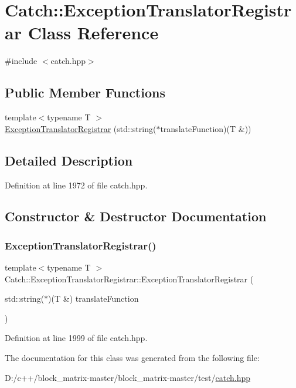 \hypertarget{class_catch_1_1_exception_translator_registrar}{}\section{Catch\+:\+:Exception\+Translator\+Registrar Class Reference}
\label{class_catch_1_1_exception_translator_registrar}


{\ttfamily \#include $<$catch.\+hpp$>$}

\subsection*{Public Member Functions}
\begin{DoxyCompactItemize}
\item 
{\footnotesize template$<$typename T $>$ }\\\mbox{\hyperlink{class_catch_1_1_exception_translator_registrar_aa73229de911f26b1df6c6c87c4d9e04e}{Exception\+Translator\+Registrar}} (std\+::string($\ast$translate\+Function)(T \&))
\end{DoxyCompactItemize}


\subsection{Detailed Description}


Definition at line 1972 of file catch.\+hpp.



\subsection{Constructor \& Destructor Documentation}
\mbox{\label{class_catch_1_1_exception_translator_registrar_aa73229de911f26b1df6c6c87c4d9e04e}} 
\subsubsection{\texorpdfstring{Exception\+Translator\+Registrar()}{ExceptionTranslatorRegistrar()}}
{\footnotesize\ttfamily template$<$typename T $>$ \\
Catch\+::\+Exception\+Translator\+Registrar\+::\+Exception\+Translator\+Registrar (\begin{DoxyParamCaption}\item[{std\+::string($\ast$)(T \&)}]{translate\+Function }\end{DoxyParamCaption})\hspace{0.3cm}{\ttfamily [inline]}}



Definition at line 1999 of file catch.\+hpp.



The documentation for this class was generated from the following file\+:\begin{DoxyCompactItemize}
\item 
D\+:/c++/block\+\_\+matrix-\/master/block\+\_\+matrix-\/master/test/\mbox{\hyperlink{catch_8hpp}{catch.\+hpp}}\end{DoxyCompactItemize}
